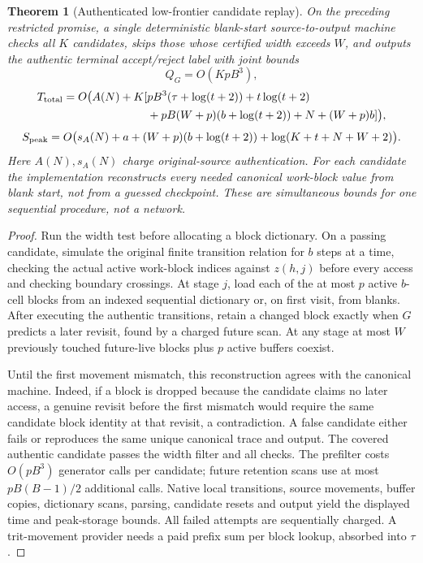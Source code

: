 \documentclass[11pt]{article}
\newtheorem{theorem}{Theorem}
\begin{document}
\begin{theorem}[Authenticated low-frontier candidate replay]
On the preceding restricted promise, a single deterministic
blank-start source-to-output machine checks all $K$ candidates,
skips those whose certified width exceeds $W$, and outputs the
authentic terminal accept/reject label with joint bounds
\[
Q_G=O(KpB^3),
\]
\[
\begin{split}
T_{\rm total}=O\bigl(A(N)+K[&
pB^3(\tau+\log(t+2))+t\log(t+2)\\
&+pB(W+p)(b+\log(t+2))+N+(W+p)b]\bigr),
\end{split}
\]
\[
S_{\rm peak}=O\bigl(s_A(N)+a+(W+p)(b+\log(t+2))
                    +\log(K+t+N+W+2)\bigr).
\]
Here $A(N),s_A(N)$ charge original-source authentication.
For each candidate the implementation reconstructs every needed
canonical work-block value from blank start, not from a guessed
checkpoint. These are \emph{simultaneous} bounds for one sequential
procedure, not a network.
\end{theorem}
\begin{proof}
Run the width test before allocating a block dictionary. On a
passing candidate, simulate the original finite transition relation
for $b$ steps at a time, checking the actual active work-block
indices against $z(h,j)$ before every access and checking boundary
crossings. At stage $j$, load each of the at most $p$ active
$b$-cell blocks from an indexed sequential dictionary or, on first
visit, from blanks. After executing the authentic transitions,
retain a changed block exactly when $G$ predicts a later revisit,
found by a charged future scan. At any stage at most $W$ previously
touched future-live blocks plus $p$ active buffers coexist.

Until the first movement mismatch, this reconstruction agrees
with the canonical machine. Indeed, if a block is dropped because
the candidate claims no later access, a genuine revisit before
the first mismatch would require the same candidate block identity
at that revisit, a contradiction. A false candidate either fails
or reproduces the same unique canonical trace and output. The
covered authentic candidate passes the width filter and all checks.
The prefilter costs $O(pB^3)$ generator calls per candidate;
future retention scans use at most $pB(B-1)/2$ additional calls.
Native local transitions, source movements, buffer copies,
dictionary scans, parsing, candidate resets and output yield
the displayed time and peak-storage bounds. All failed attempts
are sequentially charged. A trit-movement provider needs a paid
prefix sum per block lookup, absorbed into $\tau$.
\end{proof}
\end{document}
